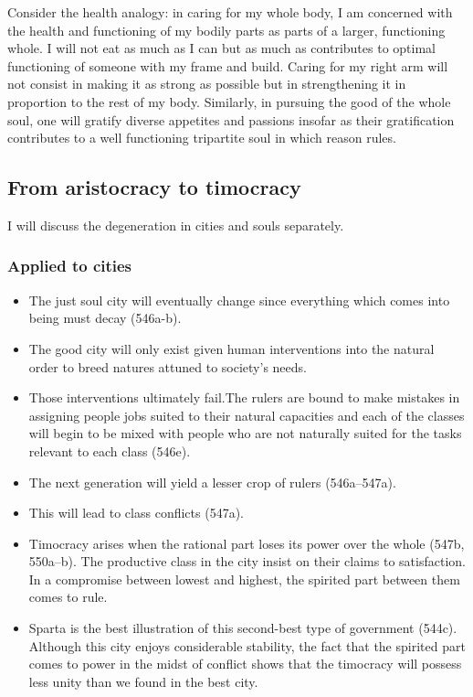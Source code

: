 \documentclass[oneside]{article}
\begin{document}
Consider the health analogy: in caring for my whole body, I am concerned
with the health and functioning of my bodily parts as parts of a larger,
functioning whole. I will not eat as much as I can but as much as
contributes to optimal functioning of someone with my frame and build.
Caring for my right arm will not consist in making it as strong as
possible but in strengthening it in proportion to the rest of my body.
Similarly, in pursuing the good of the whole soul, one will gratify
diverse appetites and passions insofar as their gratification
contributes to a well functioning tripartite soul in which reason rules.

\subsection*{From aristocracy to timocracy}
I will discuss the degeneration in cities and souls separately. 
\subsubsection*{Applied to cities}

\begin{itemize}
\item
  The just soul city will eventually change since everything which comes
  into being must decay (546a-b).
\item
  The good city will only exist given human interventions into the
  natural order to breed natures attuned to society's needs.
\item
  Those interventions ultimately fail.The rulers are bound to make
  mistakes in assigning people jobs suited to their natural capacities
  and each of the classes will begin to be mixed with people who are not
  naturally suited for the tasks relevant to each class (546e).
\item
  The next generation will yield a lesser crop of rulers (546a--547a).
\item
  This will lead to class conflicts (547a).
\item
  Timocracy arises when the rational part loses its power over the whole
  (547b, 550a--b). The productive class in the city insist on their
  claims to satisfaction. In a compromise between lowest and highest,
  the spirited part between them comes to rule.
\item
  Sparta is the best illustration of this second-best type of government
  (544c). Although this city enjoys considerable stability, the fact
  that the spirited part comes to power in the midst of conflict shows
  that the timocracy will possess less unity than we found in the best
  city.
\end{itemize}
\end{document}
